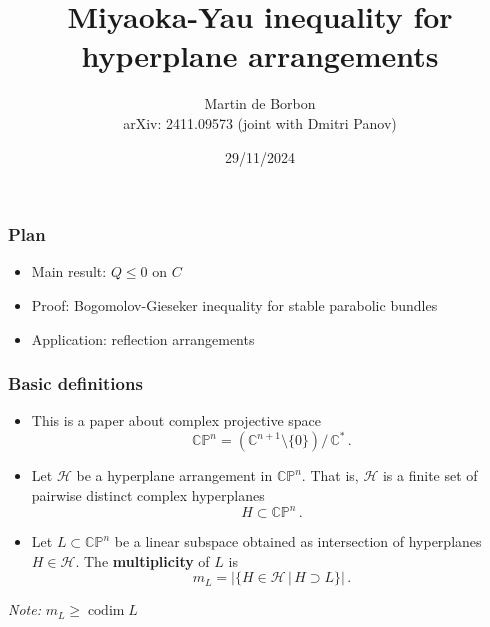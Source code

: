 \documentclass{beamer}
\title[]{Miyaoka-Yau inequality for hyperplane arrangements}
\author[Integrable Day at Loughborough]{Martin de Borbon \\
arXiv: 2411.09573 (joint with Dmitri Panov)}
\institute[]{Loughborough University}
\date{29/11/2024}
\newcommand{\C}{\mathbb{C}}
\newcommand{\CP}{\mathbb{CP}}
\newcommand{\mH}{\mathcal{H}}
\DeclareMathOperator{\codim}{codim}
\begin{document}
\begin{frame}
	\maketitle
\end{frame}




\begin{frame}
	\frametitle{Plan}
	\begin{itemize}
		\item Main result: \(Q \leq 0\) on \(C\)
		\vfill
		\item Proof: Bogomolov-Gieseker inequality for stable parabolic bundles
		\vfill
		\item Application: reflection arrangements
	\end{itemize}
\end{frame}


\begin{frame}
	\frametitle{Basic definitions}
	\begin{itemize}
		\item This is a paper about complex projective space
		\begin{equation*}
			\CP^n = \left(\C^{n+1} \setminus \{0\}\right) \big/ \, \C^*	\,.
		\end{equation*} 
		\vfill
		
		\item Let \(\mH\) be a hyperplane arrangement in \(\CP^n\).
		That is, \(\mH\) is a finite set of pairwise distinct complex hyperplanes 
		\[
		H \subset \CP^n \,.
		\]
		\vfill
		
		\item Let \(L \subset \CP^n\) be a linear subspace  obtained as intersection of hyperplanes \(H \in \mH\). 
		The \textbf{multiplicity} of \(L\) is
		\[
		m_L = \big| \{H \in \mH \,|\, H \supset L\} \big| \,.
		\]
	\end{itemize}
	
\emph{Note:} \(m_L \geq \codim L\)
\end{frame}
\end{document}
